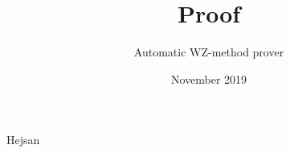 \documentclass{article}
\title{Proof}
\author{Automatic WZ-method prover}
\date{November 2019}
\begin{document}
\maketitle
Hejsan
\end{document}

